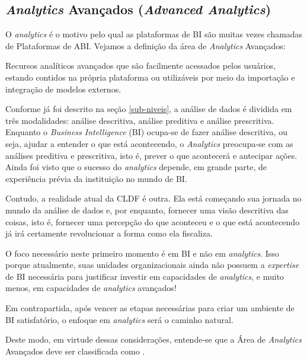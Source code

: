 \subsection{\emph{Analytics} Avançados (\emph{Advanced Analytics})}
\label{sub-analytics}

O \emph{analytics} é o motivo pelo qual as plataformas de BI são muitas vezes chamadas de Plataformas de ABI. Vejamos a definição da área de \emph{Analytics} Avançados:

\begin{definition}
Recursos analíticos avançados que são facilmente acessados pelos usuários, estando contidos na própria plataforma ou utilizáveis por meio da importação e integração de modelos externos.
\end{definition}

Conforme já foi descrito na seção \ref{sub-niveis}, a análise de dados é dividida em três modalidades: análise descritiva, análise preditiva e análise prescritiva. Enquanto o \emph{Business Intelligence} (BI) ocupa-se de fazer análise descritiva, ou seja, ajudar a entender o que está acontecendo, o \emph{Analytics} preocupa-se com as análises preditiva e prescritiva, isto é, prever o que acontecerá e antecipar ações. Ainda foi visto que o sucesso do \emph{analytics} depende, em grande parte, de experiência prévia da instituição no mundo de BI.

Contudo, a realidade atual da CLDF é outra. Ela está começando sua jornada no mundo da análise de dados e, por enquanto, fornecer uma visão descritiva das coisas, isto é, fornecer uma percepção do que aconteceu e o que está acontecendo já irá certamente revolucionar a forma como ela fiscaliza. 

O foco necessário neste primeiro momento é em BI e não em \emph{analytics}. Isso porque atualmente, suas unidades organizacionais ainda não possuem a \emph{expertise} de BI necessária para justificar investir em capacidades de \emph{analytics}, e muito menos, em capacidades de \emph{analytics} avançados!

 Em contrapartida, após vencer as etapas necessárias para criar um ambiente de BI satisfatório, o enfoque em \emph{analytics} será o caminho natural.


    Deste modo, em virtude dessas considerações, entende-se que a Área de \emph{Analytics} Avançados deve ser classificada como \COULD.